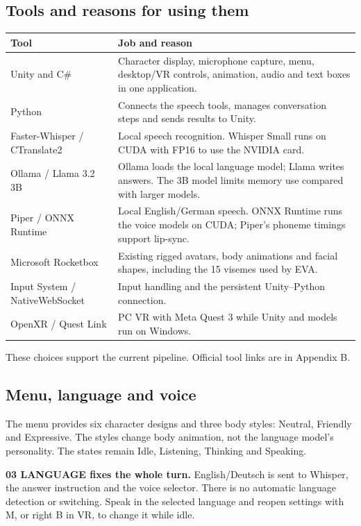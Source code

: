 \subsection{Tools and reasons for using them}
{\footnotesize
\begin{tabularx}{\linewidth}{@{}P{33mm}Y@{}}
\toprule
Tool & Job and reason\\
\midrule
Unity and C\# & Character display, microphone capture, menu, desktop/VR controls,
animation, audio and text boxes in one application.\\
Python & Connects the speech tools, manages conversation steps and sends results to Unity.\\
Faster-Whisper / CTranslate2 & Local speech recognition. Whisper Small runs on
CUDA with FP16 to use the NVIDIA card.\\
Ollama / Llama 3.2 3B & Ollama loads the local language model; Llama writes
answers. The 3B model limits memory use compared with larger models.\\
Piper / ONNX Runtime & Local English/German speech. ONNX Runtime runs the voice
models on CUDA; Piper's phoneme timings support lip-sync.\\
Microsoft Rocketbox & Existing rigged avatars, body animations and facial shapes,
including the 15 visemes used by EVA.\\
Input System / NativeWebSocket & Input handling and the persistent Unity--Python connection.\\
OpenXR / Quest Link & PC VR with Meta Quest 3 while Unity and models run on Windows.\\
\bottomrule
\end{tabularx}}
These choices support the current pipeline. Official tool links are in Appendix B.

\subsection{Menu, language and voice}
The menu provides six character designs and three body styles: Neutral,
Friendly and Expressive. The styles change body animation, not the language
model's personality. The states remain Idle, Listening, Thinking and Speaking.

\textbf{03 LANGUAGE fixes the whole turn.} English/Deutsch is sent to Whisper,
the answer instruction and the voice selector. There is no automatic language
detection or switching. Speak in the selected language and reopen settings
with M, or right B in VR, to change it while idle.

